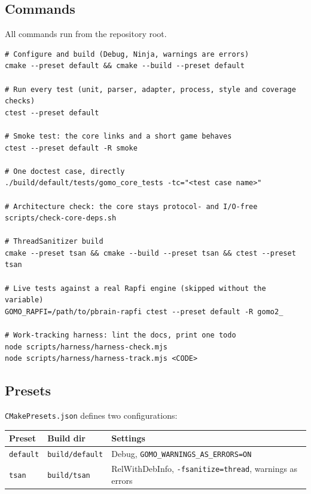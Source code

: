 \documentclass[11pt,a4paper]{article}
\newcommand{\code}[1]{\texttt{#1}}
\newcommand{\file}[1]{\texttt{#1}}
\begin{document}
\subsection{Commands}

All commands run from the repository root.

\begin{lstlisting}[style=sh]
# Configure and build (Debug, Ninja, warnings are errors)
cmake --preset default && cmake --build --preset default

# Run every test (unit, parser, adapter, process, style and coverage checks)
ctest --preset default

# Smoke test: the core links and a short game behaves
ctest --preset default -R smoke

# One doctest case, directly
./build/default/tests/gomo_core_tests -tc="<test case name>"

# Architecture check: the core stays protocol- and I/O-free
scripts/check-core-deps.sh

# ThreadSanitizer build
cmake --preset tsan && cmake --build --preset tsan && ctest --preset tsan

# Live tests against a real Rapfi engine (skipped without the variable)
GOMO_RAPFI=/path/to/pbrain-rapfi ctest --preset default -R gomo2_

# Work-tracking harness: lint the docs, print one todo
node scripts/harness/harness-check.mjs
node scripts/harness/harness-track.mjs <CODE>
\end{lstlisting}

\subsection{Presets}

\file{CMakePresets.json} defines two configurations:

\begin{center}
\small
\begin{tabular}{@{}lll@{}}
\toprule
\textbf{Preset} & \textbf{Build dir} & \textbf{Settings} \\
\midrule
\code{default} & \file{build/default} & Debug, \code{GOMO\_WARNINGS\_AS\_ERRORS=ON} \\
\code{tsan}    & \file{build/tsan}    & RelWithDebInfo, \code{-fsanitize=thread}, warnings as errors \\
\bottomrule
\end{tabular}
\end{center}
\end{document}

